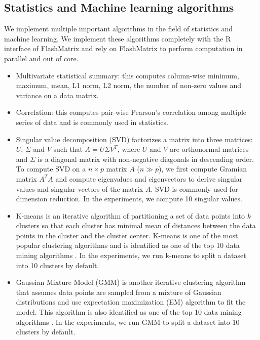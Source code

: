 \subsection{Statistics and Machine learning algorithms} \label{sec:apps}
We implement multiple important algorithms in the field of statistics and
machine learning. We implement these
algorithms completely with the R interface of FlashMatrix and
rely on FlashMatrix to perform computation in parallel and out of core.
\begin{itemize}
	\item Multivariate statistical summary: this computes column-wise minimum,
		maximum, mean, L1 norm, L2 norm, the number of non-zero values and
		variance on a data matrix.
	\item Correlation: this computes pair-wise Pearson's correlation \cite{cor}
		among multiple series of data and is commonly used in statistics.
	\item Singular value decomposition (SVD) factorizes a matrix into
		three matrices: $U$, $\Sigma$ and $V$ such that $A=U \Sigma V^T$, where
		$U$ and $V$ are orthonormal matrices and $\Sigma$ is a diagonal
		matrix with non-negative diagonals in descending order. To compute SVD
		on a $n \times p$ matrix $A$ ($n \gg p$), we first compute Gramian
		matrix $A^T A$ and compute eigenvalues and eigenvectors to derive singular
		values and singular vectors of the matrix $A$. SVD is commonly
		used for dimension reduction. In the experiments, we compute 10 singular
		values.
	\item K-means \cite{kmeans} is an iterative algorithm of partitioning a set
		of data points into $k$ clusters so that each cluster has minimal mean
		of distances between the data points in the cluster and the cluster
		center. K-means
		is one of the most popular clustering algorithms and is identified as
		one of the top 10 data mining algorithms \cite{top10}. In the experiments,
		we run k-means to split a dataset into 10 clusters by default.
	\item Gaussian Mixture Model (GMM) \cite{gmm} is another iterative clustering
		algorithm that assumes data points are sampled from a mixture of
		Gaussian distributions and use expectation maximization (EM) \cite{gmm}
		algorithm to fit the model. This algorithm is also identified as one
		of the top 10 data mining algorithms \cite{top10}. In the experiments,
		we run GMM to split a dataset into 10 clusters by default.
\end{itemize}

